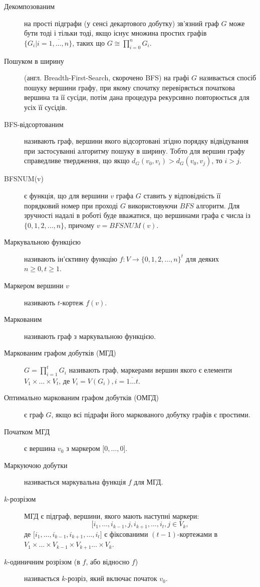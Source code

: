 \begin{description}
\item[Декомпозованим] на прості підграфи (у сенсі декартового добутку) зв'язний граф $G$ може бути тоді і тільки тоді, якщо існує множина простих графів $\lbrace G_i \vert i=\overline{1,\dots,n} \rbrace$, таких що $G \cong \displaystyle\prod_{i=0}^n G_i$.
\item[Пошуком в ширину] (англ. Breadth-First-Search, скорочено BFS)  на графі $G$ називається спосіб пошуку вершини графу, при якому спочатку перевіряється початкова вершина та її сусіди, потім дана процедура рекурсивно повторюється для усіх її сусідів.
\item[BFS-відсортованим] називають граф, вершини якого відсортовані згідно порядку відвідування при застосуванні алгоритму пошуку в ширину.
Тобто для вершин графу справедливе твердження, що якщо $d_G(v_0,v_i)>d_G(v_0,v_j)$, то $i>j$.
\item[BFSNUM(v)] є функція, що для вершини $v$ графа $G$ ставить у відповідність її порядковий номер при проході $G$ використовуючи $BFS$ алгоритм.
Для зручності надалі в роботі буде вважатися, що вершинами графа є числа із $\lbrace 0,1,2, \dots, n \rbrace$, причому $v=BFSNUM(v)$.
\item[Маркувальною функцією] називають ін'єктивну функцію $f : V\to\lbrace 0,1,2,\dots,n \rbrace^t$ для деяких $n \geq 0, t \geq 1$.
\item[Маркером вершини $v$] називають $t$-кортеж $f(v)$.
\item[Маркованим] називають граф з маркувальною функцією.
\item[Маркованим графом добутків (МГД)] $\displaystyle G=\prod_{i=1}^t G_i$ називають граф, маркерами вершин якого є елементи $V_1 \times \dots \times V_t$, де $V_i = V(G_i), i=\overline{1 \dots t}$.
\item[Оптимально маркованим графом добутків (ОМГД)] є граф $G$, якщо всі підрафи його маркованого добутку графів є простими.
\item[Початком МГД] є вершина $v_0$ з маркером $\lbrack 0,\dots,0 \rbrack$.
\item[Маркуючою добутки] називається маркувальна функція $f$ для МГД.
\item[$k$-розрізом] МГД є підграф, вершини, якого мають наступні маркери:$$\lbrack i_1,\dots,i_{k-1},j,i_{k+1},\dots,i_t,j \in V_k,$$ де $\lbrack i_1,\dots,i_{k-1},i_{k+1},\dots,i_t \rbrack$ є фіксованими $(t-1)$-кортежами в $V_1 \times \dots \times V_{k-1} \times V_{k+1} \dots \times V_k$.
\item[$k$-одиничним розрізом (в $f$, або відносно $f$)] називається $k$-розріз, який включає початок $v_0$.

\end{description}
